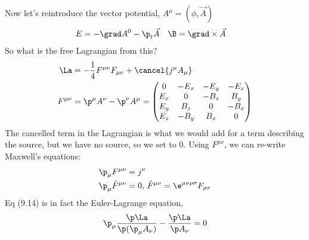\documentclass[a4paper, 11pt, normalem]{report}
\begin{document}
Now let's reintroduce the vector potential, $A^\mu = (\phi,\vec{A})$
\begin{align}
    E &= -\grad A^0 - \p_t\vec{A} & \B &= \grad\times\vec{A}
\end{align} 
So what is the free Lagrangian from this?
\begin{align}
    \La &= -\frac14F^{\mu\nu}F_{\mu\nu} + \cancel{j^\mu A_\mu} \\
    F^{\mu\nu} &= \p^\mu A^\nu - \p^\nu A^\mu = \begin{pmatrix} 0 & -E_x & -E_y & -E_z \\ E_x & 0 & -B_z & B_y \\ E_y & B_z & 0 & -B_x \\ E_z & -B_y & B_x & 0 \end{pmatrix}
\end{align}
The cancelled term in the Lagrangian is what we would add for a term describing the source, but we have no source, so we set to 0.
Using $F^{\mu\nu}$, we can re-write Maxwell's equations:
\begin{align}
    \p_\mu F^{\mu\nu} &= j^\nu \\
    \p_\mu \tilde{F}^{\mu\nu} &= 0,\, \tilde{F}^{\mu\nu} = \e^{\mu\nu\rho\sigma}F_{\rho\sigma}
\end{align}
Eq (9.14) is in fact the Euler-Lagrange equation,
\begin{align}
    \p_\mu\frac{\p\La}{\p(\p_\mu A_\nu)} - \frac{\p\La}{\p A_\nu} = 0
\end{align}
\end{document}

